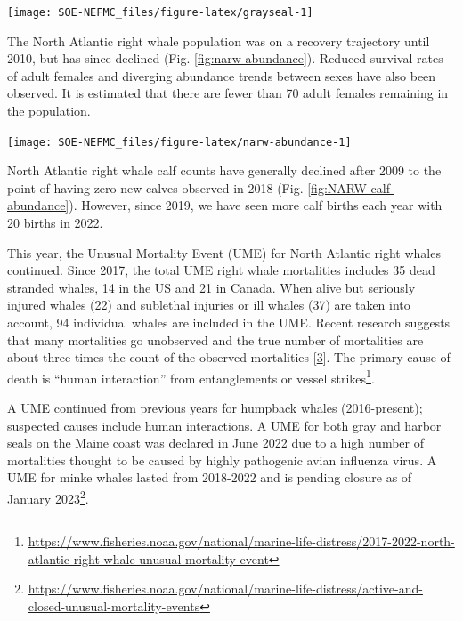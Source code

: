 \documentclass[
  10pt,
]{article}
\let\origfigure\figure
\let\endorigfigure\endfigure
\renewenvironment{figure}[1][2] {
    \expandafter\origfigure\expandafter[H]
} {
    \endorigfigure
}
\begin{document}
\begin{figure}

{\centering \texttt{[image: SOE-NEFMC\_files/figure-latex/grayseal-1]} 

}

\caption{Gray Seal average bycatch estimate for gillnet fisheries (blue) and and the potential biological removal (red).}\label{fig:grayseal}
\end{figure}

The North Atlantic right whale population was on a recovery trajectory until 2010, but has since declined (Fig. \ref{fig:narw-abundance}). Reduced survival rates of adult females and diverging abundance trends between sexes have also been observed. It is estimated that there are fewer than 70 adult females remaining in the population.

\begin{figure}

{\centering \texttt{[image: SOE-NEFMC\_files/figure-latex/narw-abundance-1]} 

}

\caption{Estimated North Atlanic right whale abundance on the Northeast Shelf.}\label{fig:narw-abundance}
\end{figure}

North Atlantic right whale calf counts have generally declined after 2009 to the point of having zero new calves observed in 2018 (Fig. \ref{fig:NARW-calf-abundance}). However, since 2019, we have seen more calf births each year with 20 births in 2022.

This year, the Unusual Mortality Event (UME) for North Atlantic right whales continued. Since 2017, the total UME right whale mortalities includes 35 dead stranded whales, 14 in the US and 21 in Canada. When alive but seriously injured whales (22) and sublethal injuries or ill whales (37) are taken into account, 94 individual whales are included in the UME. Recent research suggests that many mortalities go unobserved and the true number of mortalities are about three times the count of the observed mortalities {[}\protect\hyperlink{ref-pace_cryptic_2021}{3}{]}. The primary cause of death is ``human interaction'' from entanglements or vessel strikes\footnote{\url{https://www.fisheries.noaa.gov/national/marine-life-distress/2017-2022-north-atlantic-right-whale-unusual-mortality-event}}.

A UME continued from previous years for humpback whales (2016-present); suspected causes include human interactions. A UME for both gray and harbor seals on the Maine coast was declared in June 2022 due to a high number of mortalities thought to be caused by highly pathogenic avian influenza virus. A UME for minke whales lasted from 2018-2022 and is pending closure as of January 2023\footnote{\url{https://www.fisheries.noaa.gov/national/marine-life-distress/active-and-closed-unusual-mortality-events}}.
\end{document}
